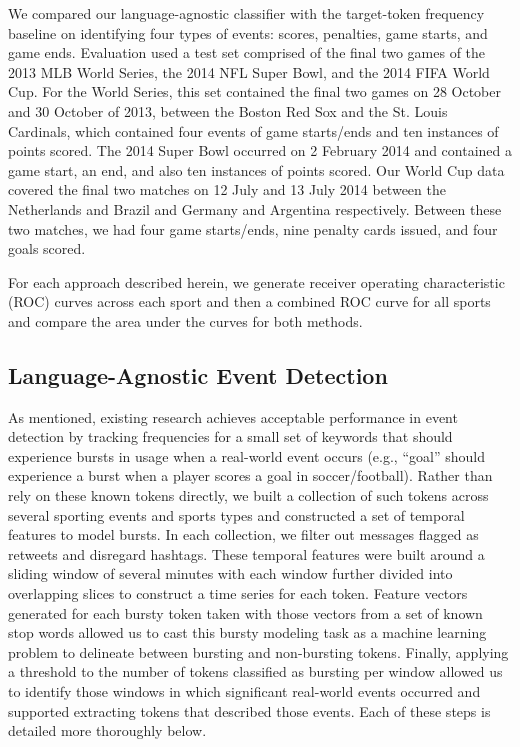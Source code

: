 \documentclass{acm_proc_article-sp}
\begin{document}
We compared our language-agnostic classifier with the target-token frequency baseline on identifying four types of events: scores, penalties, game starts, and game ends.
Evaluation used a test set comprised of the final two games of the 2013 MLB World Series, the 2014 NFL Super Bowl, and the 2014 FIFA World Cup.
For the World Series, this set contained the final two games on 28 October and 30 October of 2013, between the Boston Red Sox and the St. Louis Cardinals, which contained four events of game starts/ends and ten instances of points scored.
The 2014 Super Bowl occurred on 2 February 2014 and contained a game start, an end, and also ten instances of points scored.
Our World Cup data covered the final two matches on 12 July and 13 July 2014 between the Netherlands and Brazil and Germany and Argentina respectively.
Between these two matches, we had four game starts/ends, nine penalty cards issued, and four goals scored.

For each approach described herein, we generate receiver operating characteristic (ROC) curves across each sport and then a combined ROC curve for all sports and compare the area under the curves for both methods.

\subsection{Language-Agnostic Event Detection}

As mentioned, existing research achieves acceptable performance in event detection by tracking frequencies for a small set of keywords that should experience bursts in usage when a real-world event occurs (e.g., ``goal'' should experience a burst when a player scores a goal in soccer/football).
Rather than rely on these known tokens directly, we built a collection of such tokens across several sporting events and sports types and constructed a set of temporal features to model bursts.
In each collection, we filter out messages flagged as retweets and disregard hashtags.
These temporal features were built around a sliding window of several minutes with each window further divided into overlapping slices to construct a time series for each token.
Feature vectors generated for each bursty token taken with those vectors from a set of known stop words allowed us to cast this bursty modeling task as a machine learning problem to delineate between bursting and non-bursting tokens.
Finally, applying a threshold to the number of tokens classified as bursting per window allowed us to identify those windows in which significant real-world events occurred and supported extracting tokens that described those events.
Each of these steps is detailed more thoroughly below.
\end{document}
